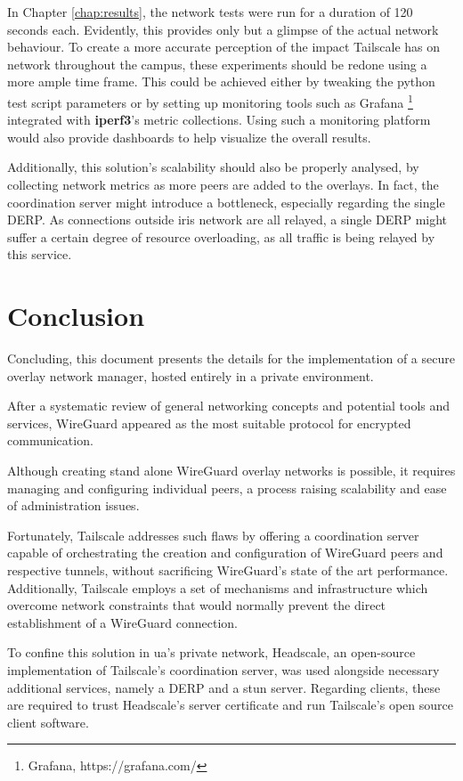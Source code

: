\documentclass[11pt,twoside,a4paper]{report}
\begin{document}
In Chapter \ref{chap:results}, the network tests were run for a duration of 120 seconds each. Evidently, this provides only but a glimpse of the actual network behaviour. To create a more accurate perception of the impact Tailscale has on network throughout the campus, these experiments should be redone using a more ample time frame. This could be achieved either by tweaking the python test script parameters or by setting up monitoring tools such as Grafana \footnote{Grafana, https://grafana.com/} integrated with \textbf{iperf3}'s metric collections. Using such a monitoring platform would also provide dashboards to help visualize the overall results.

Additionally, this solution's scalability should also be properly analysed, by collecting network metrics as more peers are added to the overlays. In fact, the coordination server might introduce a bottleneck, especially regarding the single \ac{DERP}. As connections outside \ac{iris} network are all relayed, a single \ac{DERP} might suffer a certain degree of resource overloading, as all traffic is being relayed by this service.

\chapter{Conclusion}

Concluding, this document presents the details for the implementation of a secure overlay network manager, hosted entirely in a private environment.

After a systematic review of general networking concepts and potential tools and services, WireGuard appeared as the most suitable protocol for encrypted communication.

Although creating stand alone WireGuard overlay networks is possible, it requires managing and configuring individual peers, a process raising scalability and ease of administration issues.

Fortunately, Tailscale addresses such flaws by offering a coordination server capable of orchestrating the creation and configuration of WireGuard peers and respective tunnels, without sacrificing WireGuard's state of the art performance. Additionally, Tailscale employs a set of mechanisms and infrastructure which overcome network constraints that would normally prevent the direct establishment of a WireGuard connection.

To confine this solution in \ac{ua}'s private network, Headscale, an open-source implementation of Tailscale's coordination server, was used alongside necessary additional services, namely a \ac{DERP} and a \ac{stun} server. Regarding clients, these are required to trust Headscale's server certificate and run Tailscale's open source client software.
\end{document}
